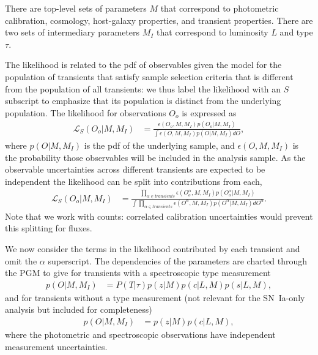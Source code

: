 \documentclass[preprint,3p]{elsarticle}
\begin{document}
There are top-level  sets of parameters $M$ that correspond to photometric calibration, cosmology,
host-galaxy properties, and transient properties.
There are two sets of intermediary parameters $M_I$ that correspond to luminosity $L$ and type $\tau$.

The likelihood is related to the pdf of observables given the model for the population of transients that satisfy sample
selection criteria that is different from the population of all transients: we thus label the likelihood with
an $S$ subscript to emphasize that its population is distinct from the underlying population.
The likelihood for observations $O_o$ is expressed as
\begin{align}
\mathcal{L}_S(O_o | M, M_I) & = \frac{\epsilon(O_o, M, M_I) p(O_o|M, M_I)}{\int  \epsilon(O, M, M_I) p(O|M, M_I)dO},
\label{likelihood:eqn}
\end{align}
where $p(O|M, M_I)$ is the pdf of the underlying sample, and $\epsilon(O, M, M_I) $
is the probability those observables will be included in the analysis sample.
As the observable uncertainties across different transients
are expected to be independent the likelihood can be split into contributions
from each,
\begin{align*}
\mathcal{L}_S(O_o | M, M_I) & = \frac{\prod_{\alpha \in transients} \epsilon(O_o^\alpha, M, M_I) p(O_o^\alpha|M, M_I)}{\int \prod_{\alpha \in transients}  \epsilon(O^\alpha, M, M_I) p(O^\alpha|M, M_I)dO^\alpha}.
\end{align*}
Note that we work with counts:  correlated calibration uncertainties would prevent this splitting for fluxes.

We now consider the terms in the likelihood contributed by each transient and omit the $\alpha$ superscript. 
The dependencies of the parameters are charted through the PGM to give for transients with a  spectroscopic type measurement
\begin{align*}
p(O| M, M_I) & = P(T |\tau) p(z | M) p(c | L, M) p (s|L, M),
\end{align*}
and for transients without a type measurement (not relevant for the SN~Ia-only analysis but included for completeness)
\begin{align*}
p(O| M, M_I) & = p(z | M) p(c | L, M),
\end{align*}
where the photometric and spectroscopic observations have independent measurement uncertainties.
\end{document}

